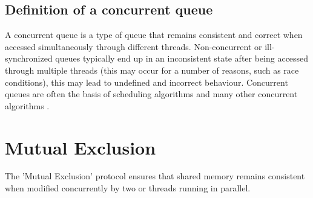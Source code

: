 \subsection{Definition of a concurrent queue}
A concurrent queue is a type of queue that remains consistent and correct when accessed simultaneously through different threads. Non-concurrent or ill-synchronized queues typically end up in an inconsistent state after being accessed through multiple threads (this may occur for a number of reasons, such as race conditions)\cite{yahav2003automatically}, this may lead to undefined and incorrect behaviour. Concurrent queues are often the basis of scheduling algorithms and many other concurrent algorithms \cite{yahav2003automatically}.


\section{Mutual Exclusion}
The 'Mutual Exclusion' protocol ensures that shared memory remains consistent when modified concurrently by two or threads running in parallel.

